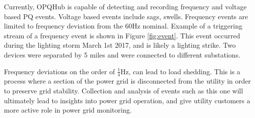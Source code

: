 \documentclass[a4paper, conference]{IEEEtran}
\begin{document}
Currently, OPQHub is capable of detecting and recording frequency and 
voltage based PQ events. Voltage based events include sags, swells.
Frequency events are limited to frequency deviation from the 60Hz nominal. Example of a triggering stream of a frequency event is shown in Figure \ref{fig:event}. This event occurred during the lighting storm March 1st 2017, and is likely a lighting strike. Two devices were separated by 5 miles and were connected to different substations. 

Frequency deviations on the order of $\frac{1}{4}$Hz, can lead to load shedding\cite{GE_LS}. This is a process where a section of the power grid is disconnected from the utility in order to preserve grid stability. Collection and analysis of events such as this one will ultimately lead to insights into power grid operation, and give utility customers a more active role in power grid monitoring.

%



%
%





\end{document}
